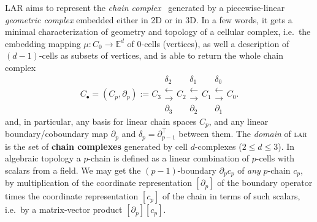 \documentclass{article}
\newcommand{\E}{\mathbb{E}}
\begin{document}
\textsc{LAR}
aims to represent the \emph{chain complex}~\cite{TSAS} generated by a piecewise-linear \emph{geometric complex} embedded either in 2D or in 3D. 
In a few words, it gets a minimal characterization of geometry and topology of a cellular complex, i.e.~the embedding mapping $\mu : C_0 \to \E^d$ of 0-cells (vertices), as well a description of $(d-1)$-cells as subsets of vertices, and is able to return the whole chain complex 
\[
C_\bullet = (C_p, \partial_p) := 
C_3 
\substack{
\delta_2 \\
\longleftarrow \\
\longrightarrow \\
\partial_3 
}
C_2 
\substack{
\delta_1 \\
\longleftarrow \\
\longrightarrow \\
\partial_2 
}
C_1  
\substack{
\delta_0 \\
\longleftarrow  \\
\longrightarrow \\
\partial_1 
}
C_0 .
\]
\noindent
and, in particular, any basis for linear chain spaces $C_p$, and any linear
boundary/coboundary map \(\partial_p\) and
\(\delta_p=\partial_{p-1}^\top\) between them. The \emph{domain} of \textsc{lar} is the set of \textbf{chain complexes} generated by cell $d$-complexes ($2\leq d\leq 3$). 
In algebraic topology a $p$-chain is defined as a linear combination of $p$-cells with scalars from a field. 
%
We may get the $(p-1)$-boundary $\partial_p c_p$ of \emph{any} $p$-chain $c_p$, by multiplication of the coordinate representation $[\partial_p]$ of the boundary operator times the coordinate representation $[c_p]$ of the chain in terms of such scalars, i.e.~by a  matrix-vector product $ [\partial_p] [c_p] $.
\end{document}
